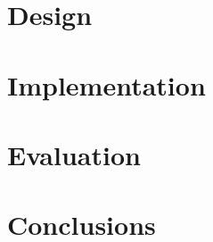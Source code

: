 \documentclass[MSc,12pt]{wsuthesis}
\begin{document}
\chapter{Design}
 

\chapter{Implementation}

  
\chapter{Evaluation}


\chapter{Conclusions}




\newpage
\singlespacing



\appendix
% 
\end{document}
